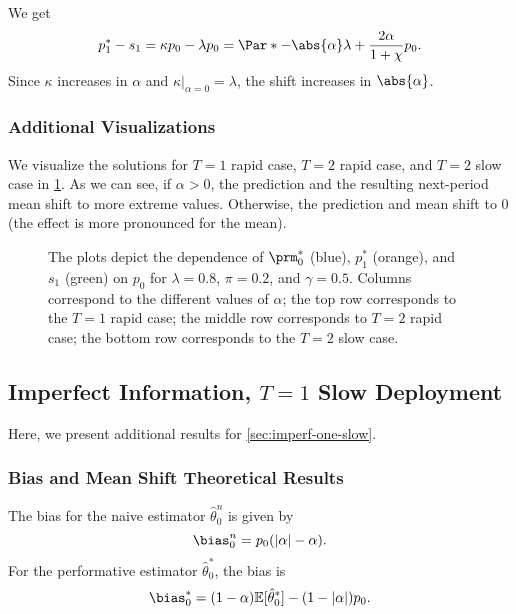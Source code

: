 We get
\[
    p^*_1 - s_1 = \kappa p_0 - \lambda p_0 = \Par*{-\abs{\alpha} \lambda +
    \frac{2 \alpha}{1 + \chi}} p_0.
\]
Since $\kappa$ increases in $\alpha$ and $\kappa|_{\alpha=0} = \lambda$,
the shift increases in $\abs{\alpha}$.

\subsubsection{Additional Visualizations}

We visualize the solutions for $T=1$ rapid case, $T=2$ rapid case, and $T=2$
slow case in \cref{fig:fin-sols}. As we can see, if $\alpha > 0$, the
prediction and the resulting next-period mean shift to more extreme values.
Otherwise, the prediction and mean shift to $0$ (the effect is more pronounced
for the mean).

\begin{figure}[ht]
    
    \caption{The plots depict the dependence of $\prm^*_0$ (blue), $p^*_1$
    (orange), and $s_1$ (green) on $p_0$ for $\lambda = 0.8$, $\pi = 0.2$, and
    $\gamma=0.5$. Columns correspond to the different values of $\alpha$; the
    top row corresponds to the $T=1$ rapid case; the middle row corresponds to
    $T=2$ rapid case; the bottom row corresponds to the $T=2$ slow case.}
    \label{fig:fin-sols}
\end{figure}

\subsection{Imperfect Information, \texorpdfstring{$T=1$}{T=1} Slow Deployment}

Here, we present additional results for \cref{sec:imperf-one-slow}.

\subsubsection{Bias and Mean Shift Theoretical Results}

The bias for the naive estimator $\hat{\theta}_0^n$ is given by
\begin{equation*}
    \bias_0^n = p_0(|\alpha| - \alpha).
\end{equation*}
For the performative estimator $\hat{\theta}_0^\ast$, the bias is 
\begin{equation*}
    \bias_0^\ast= (1 - \alpha) \mathbb{E}[\hat{\theta}_0^\ast] - (1 - |\alpha|) p_0.
\end{equation*}

